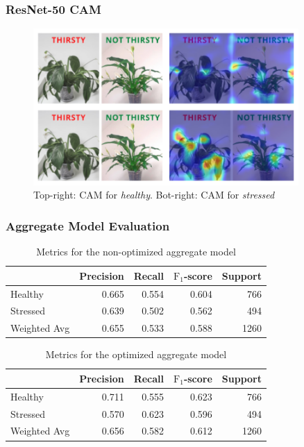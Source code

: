 \documentclass{beamer}
\begin{document}
\begin{frame}
  \frametitle{ResNet-50 CAM}
  \begin{figure}[htbp]
    \centerline{\includegraphics[width=0.9\textwidth]{graphics/classifier-cam.pdf}}
    \caption[]{\label{fig:classifier-cam} Top-right: CAM for
      \emph{healthy}. Bot-right: CAM for \emph{stressed}}
  \end{figure}
\end{frame}

\begin{frame}
  \frametitle{Aggregate Model Evaluation}
  \begin{table}
    \centering
    \begin{tabular}{lrrrr}
      \toprule
      {} &  Precision &  Recall &  $\mathrm{F}_{1}$-score &  Support \\
      \midrule
      Healthy      &      \num{0.665} &   \num{0.554} &     \num{0.604} &    \num{766} \\
      Stressed     &      \num{0.639} &   \num{0.502} &     \num{0.562} &    \num{494} \\
      Weighted Avg &      \num{0.655} &   \num{0.533} &     \num{0.588} &   \num{1260} \\
      \bottomrule
    \end{tabular}
    \caption{Metrics for the non-optimized aggregate model}
    \label{tab:model-metrics}
  \end{table}
  \begin{table}
    \centering
    \begin{tabular}{lrrrr}
      \toprule
      {} &  Precision &  Recall &  $\mathrm{F}_{1}$-score &  Support \\
      \midrule
      Healthy      &      0.711 &   0.555 &     0.623 &    766 \\
      Stressed     &      0.570 &   0.623 &     0.596 &    494 \\
      Weighted Avg &      0.656 &   0.582 &     0.612 &   1260 \\
      \bottomrule
    \end{tabular}
    \caption{Metrics for the optimized aggregate model}
    \label{tab:model-metrics-hyp}
  \end{table}
\end{frame}
\end{document}
